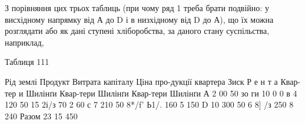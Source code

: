 З порівняння цих трьох таблиць (при чому ряд 1 треба брати подвійно:
у висхідному напрямку від А до D і в низхідному від D до А), що їх можна
розглядати або як дані ступені хліборобства, за даного стану суспільства, наприклад,

Таблиця 111

Рід  землі    Продукт        Витрата  капіталу    Ціна про-дукції квартера    Зиск        Р е    н т
а
    Квар-тер и    Шилінґи            Квар-тери    Шилінґи    Квар-тери    Шилінґи
А    2    00    50    зо    ги    10    0    0
в    4    120    50    15    2і/з    70    2    60
с    7    210    50    8*/f'    Ь1/.    160    5    150
D    10    300    50    6    8] /з    250    8    240
Разом 23                            15    450
\parbreak{}  %
